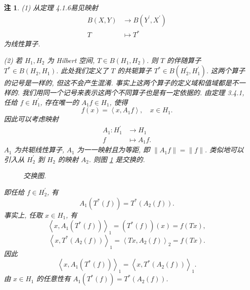 \documentclass[openany]{ctexbook}
\theoremstyle{kaiti}
\theoremstyle{normal}
\newtheorem{remark}{注}[section]
\begin{document}
\begin{remark}
(1) 从定理 4.1.6易见映射
$$
\begin{aligned}
B(X, Y) & \rightarrow B\left(Y^{\prime}, X^{\prime}\right) \\
T & \mapsto T^{*}
\end{aligned}
$$
为线性算子.

(2) 若 $H_1, H_2$ 为 Hilbert 空间, $T \in B\left(H_1, H_2\right)$. 则 $T$ 的伴随算子 $T^{*} \in B\left(H_2, H_1\right)$. 此处我们定义了 $T$ 的共轭算子 $T^{*} \in B\left(H_2^{\prime}, H_1^{\prime}\right)$. 这两个算子的记号是一样的, 但这不会产生混淆. 事实上这两个算子的定义域和值域都是不一样的. 我们用同一个记号来表示这两个不同算子也是有一定依据的. 由定理 3.4.1, 任给 $f \in H_1^{\prime}$, 存在唯一的 $A_1 f \in H_1$, 使得
$$
f(x)=\left\langle x, A_1 f\right\rangle, \quad x \in H_1.
$$
因此可以考虑映射
$$
\begin{aligned}
  A_1: H_1^{\prime} &\rightarrow H_1\\
  f &\mapsto A_1 f.
\end{aligned}
$$
$A_1$ 为共轭线性算子, $A_1$ 为一一映射且为等距, 即 $\left\|A_1 f\right\|=\|f\|$. 类似地可以引入从 $H_2^{\prime}$ 到 $H_2$ 的映射 $A_2$. 则图 \ref{fig:4_1} 是交换的.

\begin{figure}[h]
  \centering
  \caption{交换图.}
  \label{fig:4_1}
\end{figure}

即任给 $f \in H_2^{\prime}$, 有
$$
A_1\left(T^{*}(f)\right)=T^{*}\left(A_2(f)\right).
$$
事实上, 任取 $x \in H_1$, 有
$$
\left\langle x, A_1\left(T^{*}(f)\right)\right\rangle_1=\left(T^{*}(f)\right)(x)=f(T x),
$$
$$
\left\langle x, T^{*}\left(A_2(f)\right)\right\rangle_1=\left\langle T x, A_2(f)\right\rangle_2=f(T x).
$$
因此
$$
\left\langle x, A_1\left(T^{*}(f)\right)\right\rangle_1=\left\langle x, T^{*}\left(A_2(f)\right)\right\rangle_1.
$$
由 $x \in H_1$ 的任意性有 $A_1\left(T^{*}(f)\right)=T^{*}\left(A_2(f)\right)$.
\end{remark}
\end{document}

